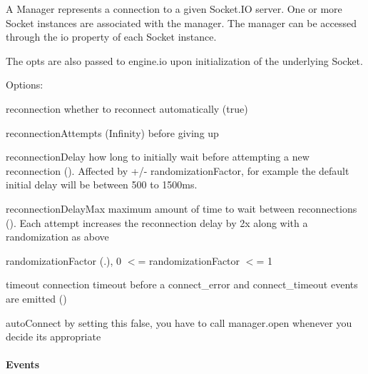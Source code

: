 A {\ttfamily Manager} represents a connection to a given Socket.\+IO server. One or more {\ttfamily Socket} instances are associated with the manager. The manager can be accessed through the {\ttfamily io} property of each {\ttfamily Socket} instance.

The {\ttfamily opts} are also passed to {\ttfamily engine.\+io} upon initialization of the underlying {\ttfamily Socket}.

Options\+:
\begin{DoxyItemize}
\item {\ttfamily reconnection} whether to reconnect automatically ({\ttfamily true})
\item {\ttfamily reconnection\+Attempts} ({\ttfamily Infinity}) before giving up
\item {\ttfamily reconnection\+Delay} how long to initially wait before attempting a new reconnection ({}). Affected by +/-\/ {\ttfamily randomization\+Factor}, for example the default initial delay will be between 500 to 1500ms.
\item {\ttfamily reconnection\+Delay\+Max} maximum amount of time to wait between reconnections ({}). Each attempt increases the reconnection delay by 2x along with a randomization as above
\item {\ttfamily randomization\+Factor} ({.}), 0 $<$= randomization\+Factor $<$= 1
\item {\ttfamily timeout} connection timeout before a {\ttfamily connect\+\_\+error} and {\ttfamily connect\+\_\+timeout} events are emitted ({})
\item {\ttfamily auto\+Connect} by setting this false, you have to call {\ttfamily manager.\+open} whenever you decide it\textquotesingle{}s appropriate
\end{DoxyItemize}

\paragraph*{Events}


